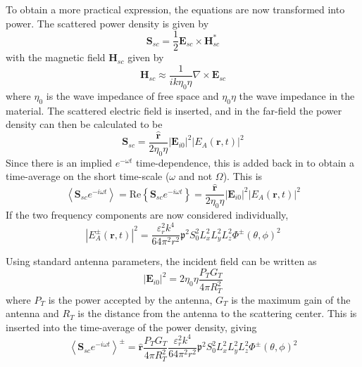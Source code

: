 \documentclass[10pt,a4paper]{eitExjobb}
\begin{document}
	To obtain a more practical expression, the equations are now transformed into power. The scattered power density is given by
	\begin{equation*}
	\bm{S}_{sc} = \frac{1}{2} \bm{E}_{sc} \times \bm{H}_{sc}^*
	\end{equation*}
	with the magnetic field $\bm{H}_{sc}$ given by
	\begin{equation*}
	\bm{H}_{sc} \approx \frac{1}{ik \eta_0 \eta} \nabla \times \bm{E}_{sc}
	\end{equation*}
	where $\eta_0$ is the wave impedance of free space and $\eta_0 \eta$ the wave impedance in the material. The scattered electric field is inserted, and in the far-field the power density can then be calculated to be
	\begin{equation*}
	\bm{S}_{sc} = \frac{\bm{\hat{r}}}{2\eta_0 \eta} |\bm{E}_{i0}|^2 |E_A (\bm{r},t)|^2
	\end{equation*}
	Since there is an implied $e^{-\omega t}$ time-dependence, this is added back in to obtain a time-average on the short time-scale ($\omega$ and not $\Omega$). This is
	\begin{equation*}
	\left< \bm{S}_{sc} e^{-i\omega t} \right> = \mathrm{Re}\left\{ \bm{S}_{sc} e^{-i\omega t} \right\} = \frac{\bm{\hat{r}}}{2\eta_0 \eta} |\bm{E}_{i0}|^2 |E_A (\bm{r},t)|^2
	\end{equation*}
	If the two frequency components are now considered individually,
	\begin{equation*}
	|E_A^\pm (\bm{r},t)|^2 =\frac{\varepsilon_r^2 k^4}{64 \pi^2 r^2} \mathfrak{p}^2 S_0^2 L_x^2 L_y^2 L_z^2 \Phi^\pm (\theta,\phi)^2
	\end{equation*}
	
	Using standard antenna parameters, the incident field can be written as
	\begin{equation*}
	|\bm{E}_{i0}|^2 = 2\eta_0 \eta \frac{P_T G_T}{4\pi R_T^2}
	\end{equation*}
	where $P_T$ is the power accepted by the antenna, $G_T$ is the maximum gain of the antenna and $R_T$ is the distance from the antenna to the scattering center. This is inserted into the time-average of the power density, giving
	\begin{equation*}
	\left< \bm{S}_{sc} e^{-i\omega t} \right>^\pm = \bm{\hat{r}} \frac{P_T G_T}{4\pi R_T^2} \frac{\varepsilon_r^2 k^4}{64 \pi^2 r^2} \mathfrak{p}^2 S_0^2 L_x^2 L_y^2 L_z^2 \Phi^\pm (\theta,\phi)^2
	\end{equation*}
	
\end{document}
